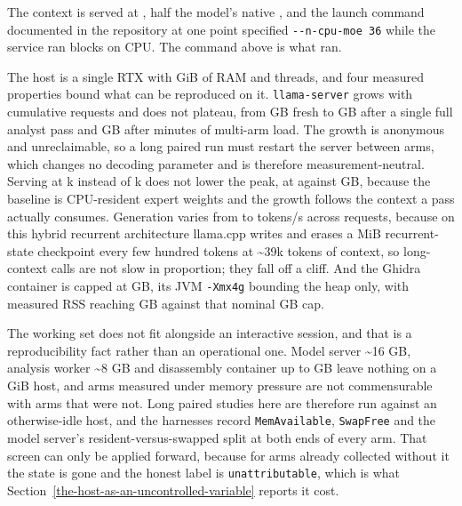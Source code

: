 The context is served at , half the model's native , and the
launch command documented in the repository at one point specified \texttt{-\/-n-cpu-moe\ 36} while
the service ran  blocks on CPU. The command above is what ran.

The host is a single RTX  with  GiB of RAM and  threads, and
four measured properties bound what can be reproduced on it. \texttt{llama-server} grows with
cumulative requests and does not plateau, from  GB fresh to
 GB after a single full analyst pass and  GB
after  minutes of multi-arm load. The growth is anonymous and
unreclaimable, so a long paired run must restart the server between arms, which changes no decoding
parameter and is therefore measurement-neutral. Serving at k instead of k
does not lower the peak, at  against  GB, because
the baseline is CPU-resident expert weights and the growth follows the context a pass actually
consumes. Generation varies from  to  tokens/s
across requests, because on this hybrid recurrent architecture llama.cpp writes and erases a
 MiB recurrent-state checkpoint every few hundred tokens at
\textasciitilde39k tokens of context, so long-context calls are not slow in proportion; they fall
off a cliff. And the Ghidra container is capped at  GB, its JVM
\texttt{-Xmx4g} bounding the heap only, with measured RSS reaching  GB against
that nominal  GB cap.

The working set does not fit alongside an interactive session, and that is a reproducibility fact
rather than an operational one. Model server \textasciitilde16 GB, analysis worker
\textasciitilde8 GB and disassembly container up to  GB leave nothing on a
 GiB host, and arms measured under memory pressure are not commensurable with arms that
were not. Long paired studies here are therefore run against an otherwise-idle host, and the
harnesses record \texttt{MemAvailable}, \texttt{SwapFree} and the model server's
resident-versus-swapped split at both ends of every arm. That screen can only be applied forward,
because for arms already collected without it the state is gone and the honest label is
\texttt{unattributable}, which is what Section~\ref{the-host-as-an-uncontrolled-variable} reports it
cost.

